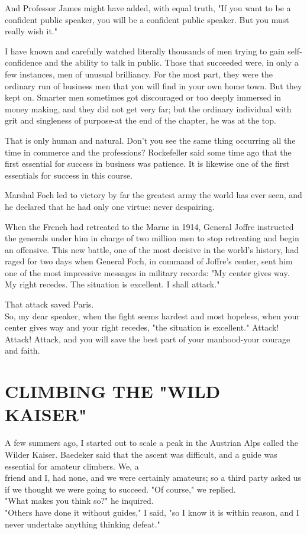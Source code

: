 \documentclass[10pt]{article}
\begin{document}
And Professor James might have added, with equal truth, "If you want to be a confident public speaker, you will be a confident public speaker. But you must really wish it."

I have known and carefully watched literally thousands of men trying to gain self-confidence and the ability to talk in public. Those that succeeded were, in only a few instances, men of unusual brilliancy. For the most part, they were the ordinary run of business men that you will find in your own home town. But they kept on. Smarter men sometimes got discouraged or too deeply immersed in money making, and they did not get very far; but the ordinary individual with grit and singleness of purpose-at the end of the chapter, he was at the top.

That is only human and natural. Don't you see the same thing occurring all the time in commerce and the professions? Rockefeller said some time ago that the first essential for success in business was patience. It is likewise one of the first essentials for success in this course.

Marshal Foch led to victory by far the greatest army the world has ever seen, and he declared that he had only one virtue: never despairing.

When the French had retreated to the Marne in 1914, General Joffre instructed the generals under him in charge of two million men to stop retreating and begin an offensive. This new battle, one of the most decisive in the world's history, had raged for two days when General Foch, in command of Joffre's center, sent him one of the most impressive messages in military records: "My center gives way. My right recedes. The situation is excellent. I shall attack."

That attack saved Paris.\\
So, my dear speaker, when the fight seems hardest and most hopeless, when your center gives way and your right recedes, "the situation is excellent." Attack! Attack! Attack, and you will save the best part of your manhood-your courage and faith.

\section*{CLIMBING THE "WILD KAISER"}
A few summers ago, I started out to scale a peak in the Austrian Alps called the Wilder Kaiser. Baedeker said that the ascent was difficult, and a guide was essential for amateur climbers. We, a\\
friend and I, had none, and we were certainly amateurs; so a third party asked us if we thought we were going to succeed. "Of course," we replied.\\
"What makes you think so?" he inquired.\\
"Others have done it without guides," I said, "so I know it is within reason, and I never undertake anything thinking defeat."
\end{document}
